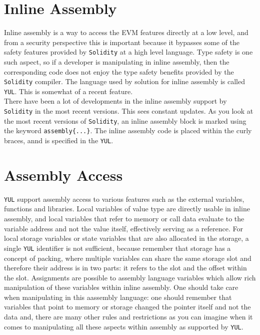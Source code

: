 \section{Inline Assembly}
Inline assembly is a way to access the EVM features directly at a low level, and from a security perspective this is important because it bypasses some of the safety features provided by \verb|Solidity| at a high level language. Type safety is one such aspect, so if a developer is manipulating in inline assembly, then the corresponding code does not enjoy the type safety benefits provided by the \verb|Solidity| compiler. The language used by solution for inline assembly is called \verb|YUL|. This is somewhat of a recent feature.\\

There have been a lot of developments in the inline assembly support by \verb|Solidity| in the most recent versions. This sees constant updates. As you look at the most recent versions of \verb|Solidity|, an inline assembly block is marked using the keyword \verb|assembly{...}|. The inline assembly code is placed within the curly braces, annd is specified in the \verb|YUL|.

\section{Assembly Access}
\verb|YUL| support assembly access to various features such as the external variables, functions and libraries. Local variables of value type are directly usable in inline assembly, and local variables that refer to memory or call data evaluate to the variable address and not the value itself, effectively serving as a reference. For local storage variables or state variables that are also allocated in the storage, a single \verb|YUL| identifier is not sufficient, because remember that storage has a concept of packing, where multiple variables can share the same storage slot and therefore their address is in two parts: it refers to the slot and the offset within the slot. Assignments are possible to assembly language variables which allow rich manipulation of these variables within inline assembly. One should take care when manipulating in this aassembly language: one should remember that variables that point to memory or storage changed the pointer itself and not the data and, there are many other rules and restrictions as you can imagine when it comes to manipulating all these aspects within assembly as supported by \verb|YUL|.


